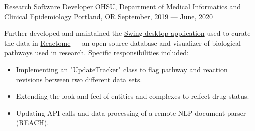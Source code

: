 \showoff
{Research Software Developer}
{OHSU, Department of Medical Informatics and Clinical Epidemiology}
{Portland, OR}
{September, 2019 --- June, 2020}

Further developed and maintained the {\textcolor{my-blue}{\href{https://github.com/reactome/CuratorTool}{Swing desktop application}}} used to curate the data in {\textcolor{my-blue}{\href{https://reactome.org/}{Reactome}}} --- an open-source database and visualizer of biological pathways used in research. Specific responsibilities included:

\begin{itemize}[label=$\triangleright$]
\item Implementing an "UpdateTracker" class to flag pathway and reaction revisions between two different data sets.
\item Extending the look and feel of entities and complexes to relfect drug status.
\item Updating API calls and data processing of a remote NLP document parser (\textcolor{my-blue}{\href{https://github.com/clulab/reach}{REACH}}).
\end{itemize}

